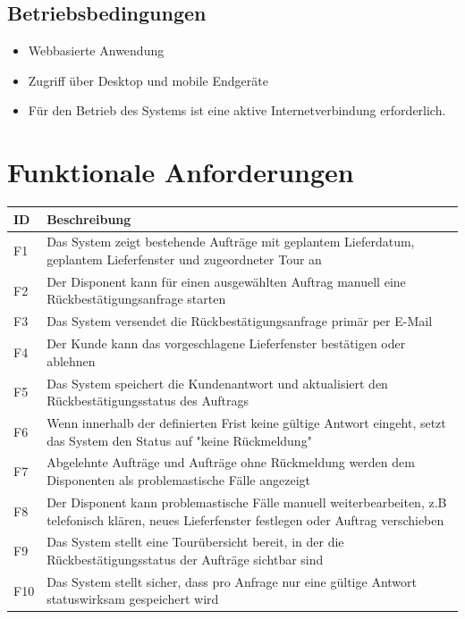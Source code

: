 \documentclass[12pt,a4paper]{article}
\begin{document}
\subsection{Betriebsbedingungen}
\begin{itemize}
    \item Webbasierte Anwendung
    \item Zugriff über Desktop und mobile Endgeräte
    \item Für den Betrieb des Systems ist eine aktive Internetverbindung erforderlich.
\end{itemize}

\section{Funktionale Anforderungen}
\begin{longtable}{|l|p{10cm}|}
\hline
ID & Beschreibung \\
\hline
F1 & Das System zeigt bestehende Aufträge mit geplantem Lieferdatum, geplantem Lieferfenster und zugeordneter Tour an \\
F2 & Der Disponent kann für einen ausgewählten Auftrag manuell eine Rückbestätigungsanfrage starten \\
F3 & Das System versendet die Rückbestätigungsanfrage primär per E-Mail \\
F4 & Der Kunde kann das vorgeschlagene Lieferfenster bestätigen oder ablehnen \\
F5 & Das System speichert die Kundenantwort und aktualisiert den Rückbestätigungsstatus des Auftrags \\
F6 & Wenn innerhalb der definierten Frist keine gültige Antwort eingeht, setzt das System den Status auf "keine Rückmeldung" \\
F7 & Abgelehnte Aufträge und Aufträge ohne Rückmeldung werden dem Disponenten als problemastische Fälle angezeigt \\
F8 & Der Disponent kann problemastische Fälle manuell weiterbearbeiten, z.B telefonisch klären, neues Lieferfenster festlegen oder Auftrag verschieben \\
F9 & Das System stellt eine Tourübersicht bereit, in der die Rückbestätigungsstatus der Aufträge sichtbar sind \\
F10 & Das System stellt sicher, dass pro Anfrage nur eine gültige Antwort statuswirksam gespeichert wird \\
\hline
\end{longtable}
\end{document}
